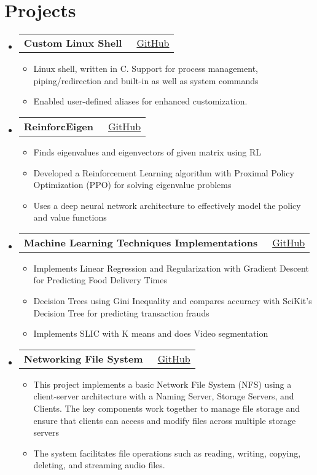 \documentclass[a4paper,10pt]{article}
\makeatletter
\newcommand{\resumeItem}[1]{\item[\textcolor{bulletcolor}{\textbullet}] \small{#1}}
\newcommand{\resumeProjectHeading}[2]{
    \item
    \begin{tabular*}{0.97\textwidth}{l@{\extracolsep{\fill}}r}
        \textbf{#1} & {\small #2} \\
    \end{tabular*}\vspace{-7pt}
}
\makeatother
\begin{document}
\section{Projects}
\begin{itemize}[leftmargin=0.15in, label={}]        
    \resumeProjectHeading
        {\textbf{Custom Linux Shell}}{{\small\faGithub}\ \href{https://github.com/mayank3135432/osn-mp1}{GitHub}}
        \begin{itemize}[leftmargin=0.15in]
            \resumeItem{Linux shell, written in C. Support for process management, piping/redirection and built-in as well as system commands}
            \resumeItem{Enabled user-defined aliases for enhanced customization.}
        \end{itemize}
    \resumeProjectHeading
        {\textbf{ReinforcEigen}}{{\small\faGithub}\ \href{https://github.com/Vedp9984/ReinforceEigen}{GitHub}}
        \begin{itemize}[leftmargin=0.15in]
            \resumeItem{Finds eigenvalues and eigenvectors of given matrix using RL}
            \resumeItem{Developed a Reinforcement Learning algorithm with Proximal Policy Optimization (PPO) for solving eigenvalue problems}
            \resumeItem{Uses a deep neural network architecture to effectively model the policy and value functions}
        \end{itemize}
    \resumeProjectHeading
        {\textbf{Machine Learning Techniques Implementations}}{{\small\faGithub}\ \href{https://github.com/mayank3135432/SMAI-Assignment-1}{GitHub}}
        \begin{itemize}[leftmargin=0.15in]
            \resumeItem{Implements Linear Regression and Regularization with Gradient Descent for Predicting Food Delivery Times}
            \resumeItem{Decision Trees using Gini Inequality and compares accuracy with SciKit's Decision Tree for predicting transaction frauds}
            \resumeItem{Implements SLIC with K means and does Video segmentation}
        \end{itemize}

        
    \resumeProjectHeading
        {\textbf{Networking File System}}{{\small\faGithub}\ \href{https://github.com/mayank3135432/Networking_File_System_Dummy}{GitHub}}
        \begin{itemize}[leftmargin=0.15in]
            \resumeItem{This project implements a basic Network File System (NFS) using a client-server architecture with a Naming Server, Storage Servers, and Clients. The key components work together to manage file storage and ensure that clients can access and modify files across multiple storage servers}
            \resumeItem{The system facilitates file operations such as reading, writing, copying, deleting, and streaming audio files.}
        \end{itemize}


\end{itemize}
\end{document}
